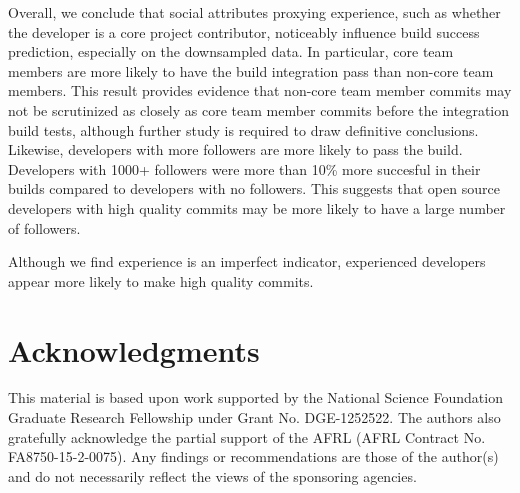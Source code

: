 \documentclass[10pt, conference]{IEEEtran}
\begin{document}
Overall, we conclude that social attributes proxying experience, such as whether
the developer is a core project contributor,
noticeably influence build success prediction, especially on the downsampled
data. 
%
In particular, core team members are
more likely to have the build integration pass than non-core team members.  This
result provides evidence that non-core team member commits may not be
scrutinized as closely as core team member commits before the integration build 
tests,
although further study is required to draw definitive
conclusions.
%
Likewise, developers with more followers are more
likely to pass the build.
Developers with 1000+ followers were more than 10\% more succesful in their
builds compared to
developers with no followers.  This suggests that open source developers with
high quality commits may be more
likely to have a large number of followers.

Although we find experience is an imperfect indicator, 
experienced developers appear more likely to make high quality commits.


\section*{Acknowledgments}
This material is based upon work supported by the National Science Foundation
Graduate Research Fellowship under Grant No. DGE-1252522.
The authors also gratefully acknowledge the partial support
of the AFRL (AFRL Contract No. FA8750-15-2-0075). Any 
findings or recommendations are those of the author(s) and do not
necessarily reflect the views of the sponsoring agencies.





%
%
%

 




\end{document}
